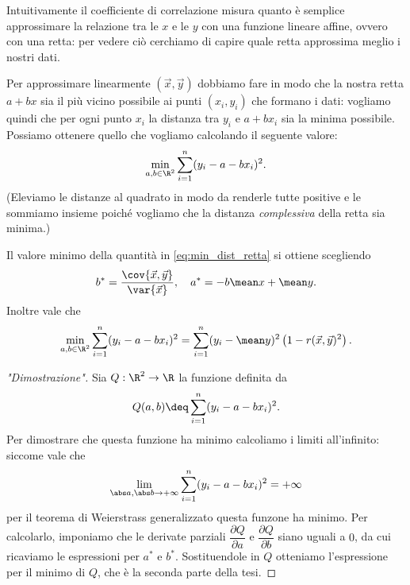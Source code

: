 Intuitivamente il coefficiente di correlazione misura quanto è semplice approssimare la relazione tra le $x$ e le $y$ con una funzione lineare affine, ovvero con una retta: per vedere ciò cerchiamo di capire quale retta approssima meglio i nostri dati.

Per approssimare linearmente $(\vec x, \vec y)$ dobbiamo fare in modo che la nostra retta $a + bx$ sia il più vicino possibile ai punti $(x_i, y_i)$ che formano i dati: vogliamo quindi che per ogni punto $x_i$ la distanza tra $y_i$ e $a+bx_i$ sia la minima possibile. Possiamo ottenere quello che vogliamo calcolando il seguente valore: \begin{equation}
    \min_{a, b \in \R^2} \sum_{i=1}^n (y_i - a - bx_i)^2.   \label{eq:min_dist_retta} 
\end{equation} (Eleviamo le distanze al quadrato in modo da renderle tutte positive e le sommiamo insieme poiché vogliamo che la distanza \emph{complessiva} della retta sia minima.)

\begin{theorem}
    Il valore minimo della quantità in \eqref{eq:min_dist_retta} si ottiene scegliendo \[
        b^\ast = \frac{\cov{\vec x, \vec y}}{\var{\vec x}}, \quad a^\ast = -b\mean x + \mean y.    
    \] Inoltre vale che \[
        \min_{a, b \in \R^2} \sum_{i=1}^n (y_i - a - bx_i)^2 = \sum_{i= 1}^n (y_i - \mean y)^2\left( 1 - r(\vec x, \vec y)^2 \right).
    \]
\end{theorem}
\begin{proof}
    ["Dimostrazione"] Sia $Q : \R^2 \to \R$ la funzione definita da \[
        Q(a, b) \deq \sum_{i=1}^n (y_i - a - bx_i)^2.
    \] Per dimostrare che questa funzione ha minimo calcoliamo i limiti all'infinito: siccome vale che \[
        \lim_{\abs a, \abs b \to +\infty} \sum_{i=1}^n (y_i - a - bx_i)^2 = +\infty    
    \] per il teorema di Weierstrass generalizzato questa funzone ha minimo. Per calcolarlo, imponiamo che le derivate parziali $\dfrac{\partial Q}{\partial a}$ e $\dfrac{\partial Q}{\partial b}$ siano uguali a $0$, da cui ricaviamo le espressioni per $a^\ast$ e $b^\ast$. Sostituendole in $Q$ otteniamo l'espressione per il minimo di $Q$, che è la seconda parte della tesi.
\end{proof}

